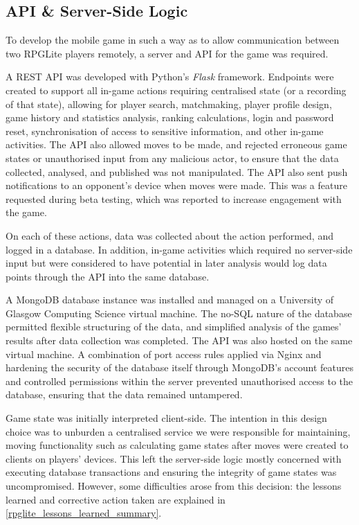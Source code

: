 \subsection{API \& Server-Side Logic}
\label{subsec:server-side-logic}

To develop the mobile game in such a way as to allow communication between two
RPGLite players remotely, a server and API for the game was required.

A REST API was developed with Python's \emph{Flask} framework. Endpoints were
created to support all in-game actions requiring centralised state (or a
recording of that state), allowing for player search, matchmaking, player
profile design, game history and statistics analysis, ranking calculations,
login and password reset, synchronisation of access to sensitive information,
and other in-game activities. The API also allowed moves to be made, and
rejected erroneous game states or unauthorised input from any malicious actor,
to ensure that the data collected, analysed, and published was not manipulated.
The API also sent push notifications to an opponent's device when moves were
made. This was a feature requested during beta testing, which was reported to
increase engagement with the game.

On each of these actions, data was collected about the action performed, and
logged in a database. In addition, in-game activities which required no
server-side input but were considered to have potential in later analysis would
log data points through the API into the same database.

A MongoDB database instance was installed and managed on a University of Glasgow
Computing Science virtual machine. The no-SQL nature of the database permitted
flexible structuring of the data, and simplified analysis of the games' results
after data collection was completed. The API was also hosted on the same virtual
machine. A combination of port access rules applied via Nginx and hardening the
security of the database itself through MongoDB's account features and
controlled permissions within the server prevented unauthorised access to the
database, ensuring that the data remained untampered.

Game state was initially interpreted client-side. The intention in this design
choice was to unburden a centralised service we were responsible for
maintaining, moving functionality such as calculating game states after moves
were created to clients on players' devices. This left the server-side logic
mostly concerned with executing database transactions and ensuring the integrity
of game states was uncompromised. However, some difficulties arose from this
decision: the lessons learned and corrective action taken are explained in
\cref{rpglite_lessons_learned_summary}.




